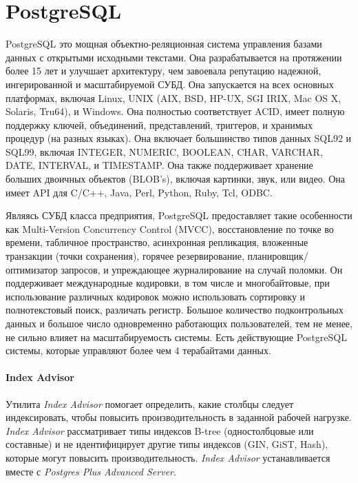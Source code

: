 \section{PostgreSQL}

PostgreSQL это мощная объектно-реляционная система управления базами данных с открытыми исходными текстами. Она разрабатывается на протяжении более 15 лет и улучшает архитектуру, чем завоевала репутацию надежной, ингерированной и масштабируемой СУБД. Она запускается на всех основных платформах, включая Linux, UNIX (AIX, BSD, HP-UX, SGI IRIX, Mac OS X, Solaris, Tru64), и Windows. Она полностью соответствует ACID, имеет полную поддержку ключей, объединений, представлений, триггеров, и хранимых процедур (на разных языках). Она включает большинство типов данных SQL92 и SQL99, включая INTEGER, NUMERIC, BOOLEAN, CHAR, VARCHAR, DATE, INTERVAL, и TIMESTAMP. Она также поддерживает хранение больших двоичных объектов (BLOB's), включая картинки, звук, или видео. Она имеет API для C/C++, Java, Perl, Python, Ruby, Tcl, ODBC. 

Являясь СУБД класса предприятия, PostgreSQL предоставляет такие особенности как Multi-Version Concurrency Control (MVCC), восстановление по точке во времени, табличное пространство, асинхронная репликация, вложенные транзакции (точки сохранения), горячее резервирование, планировщик/оптимизатор запросов, и упреждающее журналирование на случай поломки. Он поддерживает международные кодировки, в том числе и многобайтовые, при использование различных кодировок можно использовать сортировку и полнотекстовый поиск, различать регистр. Большое количество подконтрольных данных и большое число одновременно работающих пользователей, тем не менее, не сильно влияет на масштабируемость системы. Есть действующие PostgreSQL системы, которые управляют более чем 4 терабайтами данных. \cite{opensuse.org:Postgresql}

\paragraph{Index Advisor}

Утилита \textit{Index Advisor} помогает определить, какие столбцы следует индексировать, чтобы повысить производительность в заданной рабочей нагрузке. \textit{Index Advisor} рассматривает типы индексов B-tree (одностолбцовые или составные) и не идентифицирует другие типы индексов (GIN, GiST, Hash), которые могут повысить производительность. \textit{Index Advisor} устанавливается вместе с \textit{Postgres Plus Advanced Server}.

